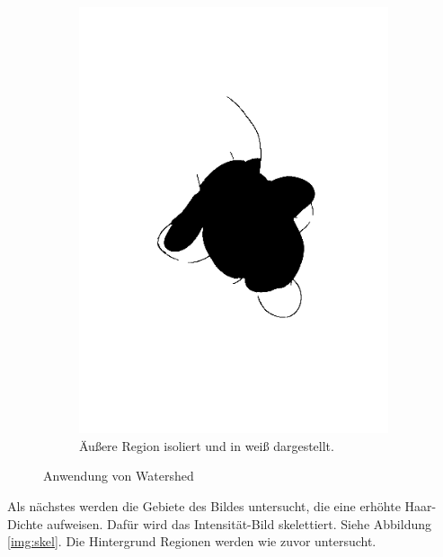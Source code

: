 \documentclass[german,a4paper, 12pt]{llncs}
\begin{document}
\begin{figure}
\begin{subfigure}[b]{0.475\textwidth}
		\includegraphics[width=\textwidth]{fig64/08outer section.png}
		\caption[]{Äußere Region isoliert und in weiß dargestellt.}
		\label{img:outerSection}
	\end{subfigure}
	\caption[  ]
	{\small Anwendung von Watershed} 
	\label{img:regionwrap}
\end{figure}

Als nächstes werden die Gebiete des Bildes untersucht, die eine erhöhte Haar-Dichte aufweisen.
Dafür wird das Intensität-Bild skelettiert. Siehe Abbildung \ref{img:skel}.
Die Hintergrund Regionen werden wie zuvor untersucht.
\end{document}

